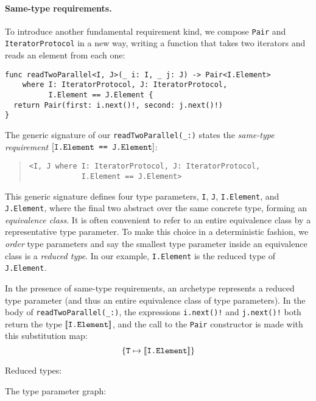 \documentclass[../generics]{subfiles}
\begin{document}
\paragraph{Same-type requirements.} To introduce another fundamental requirement kind, we compose \texttt{Pair} and \texttt{IteratorProtocol} in a new way, writing a function that takes two iterators and reads an element from each one:
\begin{Verbatim}
func readTwoParallel<I, J>(_ i: I, _ j: J) -> Pair<I.Element>
    where I: IteratorProtocol, J: IteratorProtocol,
          I.Element == J.Element {
  return Pair(first: i.next()!, second: j.next()!)
}
\end{Verbatim}
The generic signature of our \verb|readTwoParallel(_:)| states the \emph{same-type requirement} $[\texttt{I.Element == J.Element}]$:
\begin{quote}
\begin{verbatim}
<I, J where I: IteratorProtocol, J: IteratorProtocol,
            I.Element == J.Element>
\end{verbatim}
\end{quote}
This generic signature defines four type parameters, \texttt{I}, \texttt{J}, \texttt{I.Element}, and \texttt{J.Element}, where the final two abstract over the same concrete type, forming an \emph{equivalence class}. It is often convenient to refer to an entire equivalence class by a representative type parameter. To make this choice in a deterministic fashion, we \emph{order} type parameters and say the smallest type parameter inside an equivalence class is a \emph{reduced type}. In our example, \texttt{I.Element} is the reduced type of \texttt{J.Element}.

In the presence of same-type requirements, an archetype represents a reduced type parameter (and thus an entire equivalence class of type parameters). In the body of \verb|readTwoParallel(_:)|, the expressions \verb|i.next()!| and \verb|j.next()!| both return the type $[\![\texttt{I.Element}]\!]$, and the call to the \texttt{Pair} constructor is made with this substitution map:
\[\{\texttt{T} \mapsto \texttt{$[\![\texttt{I.Element}]\!]$}\}\]

\begin{MoreDetails}
\item Reduced types: 
\item The type parameter graph: 
\end{MoreDetails}
\end{document}
